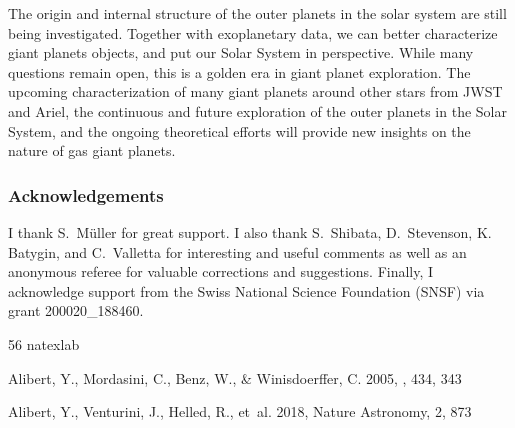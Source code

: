 \documentclass{aa}
\begin{document}
{%

The origin and internal structure of the outer planets in the solar system are still being investigated. Together with exoplanetary data, we can better characterize giant planets objects, and put our Solar System in perspective. While many questions remain open, this is a golden era in giant planet exploration. The upcoming characterization of many giant planets around other stars from JWST and Ariel, the continuous and future exploration of the outer planets in the Solar System, and the ongoing theoretical efforts will provide new insights on the nature of gas giant planets. 

\subsubsection*{Acknowledgements}
I thank S.~M{\"u}ller for great support. I also thank S.~Shibata, D.~Stevenson, K. Batygin, and C.~Valletta for interesting and useful comments as well as an anonymous referee for valuable corrections and suggestions. Finally, I   acknowledge support from the Swiss National Science Foundation (SNSF) via grant 200020\_188460.  
 
\begin{thebibliography}{56}
\expandafter\ifx\csname natexlab\endcsname\relax\def\natexlab#1{#1}\fi

{Alibert}, Y., {Mordasini}, C., {Benz}, W., \& {Winisdoerffer}, C. 2005, \aap,
  434, 343

{Alibert}, Y., {Venturini}, J., {Helled}, R., {et~al.} 2018, Nature Astronomy,
  2, 873


\end{thebibliography}}
\end{document}

